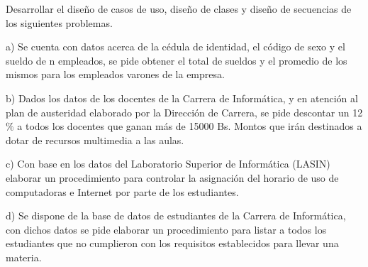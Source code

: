 Desarrollar el diseño de casos de uso, diseño de clases y diseño de secuencias de los siguientes problemas.

a) Se cuenta con datos acerca de la cédula de identidad, el código de sexo y el sueldo de n empleados, se pide obtener el total de sueldos y el promedio de los mismos para los empleados varones de la empresa.

b) Dados los datos de los docentes de la Carrera de Informática, y en atención al plan de austeridad elaborado por la Dirección de Carrera, se pide descontar un 12$\%$ a todos los docentes que ganan más de 15000 Bs. Montos que irán destinados a dotar de recursos multimedia a las aulas.

c) Con base en los datos del Laboratorio Superior de Informática (LASIN) elaborar un procedimiento para controlar la asignación del horario de uso de computadoras e Internet por parte de los estudiantes.

d) Se dispone de la base de datos de estudiantes de la Carrera de Informática, con dichos datos se pide elaborar un procedimiento para listar a todos los estudiantes que no cumplieron con los requisitos establecidos para llevar una materia.
